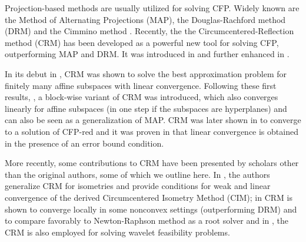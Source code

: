 \documentclass[smallextended,numbook,nospthms]{svjour3}
\theoremstyle{plain}
\theoremstyle{definition}
\def\RR{\mathds R}
\begin{document}



Projection-based methods are usually utilized for solving CFP. Widely known are the Method of Alternating Projections (MAP), the Douglas-Rachford method (DRM) and the Cimmino method \cite{Cimmino:1938tp}. Recently, the the Circumcentered-Reflection method (CRM) has been developed as a powerful new tool for solving CFP, outperforming MAP and DRM. It was introduced in \cite{Behling:2018a,Behling:2018} and further enhanced in \cite{Arefidamghani:2020,Bauschke:2018ut,Bauschke:2018wa, Bauschke:2019uh,Bauschke:2020a,Behling:2019dj,Behling:2020,Dizon:2019vq,Dizon:2020a,Ouyang:2018gu,Lindstrom:2020a}. 

In its debut in \cite{Behling:2018a,Behling:2018}, CRM was shown to solve the best approximation problem for finitely many affine subspaces with linear convergence. Following these first results, \cite{Behling:2019dj}, a block-wise variant of CRM was introduced, which also converges linearly for affine subspaces (in one step if the subspaces are hyperplanes) and can also be seen as a generalization of MAP. CRM was later shown in \cite{Behling:2020} to converge to a solution of CFP-red and it was proven in \cite{Arefidamghani:2020} that linear convergence is obtained in the presence of an error bound condition.

More recently, some contributions to CRM have been presented by scholars other than the original authors, some of which we outline here. In \cite{Bauschke:2019uh,Bauschke:2020a}, the authors generalize CRM for isometries and provide conditions for weak and linear convergence of the derived Circumcentered Isometry Method (CIM); in \cite{Dizon:2019vq} CRM is shown to converge locally in some nonconvex settings (outperforming DRM) and to compare favorably to Newton-Raphson method as a root solver and in \cite{Dizon:2020a}, the CRM is also employed for solving wavelet feasibility problems.
\end{document}
